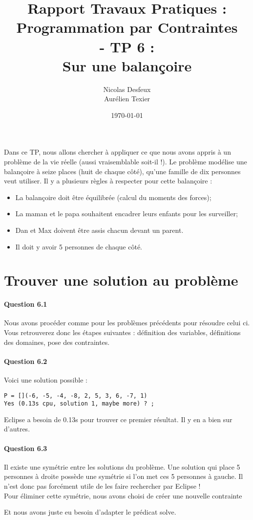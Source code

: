 \documentclass[11pt]{article} %
\date{\today}
\title{Rapport Travaux Pratiques : \\Programmation par Contraintes\\ - TP 6 : \\\textbf{Sur une balançoire}}
\author{Nicolas Desfeux\\Aurélien Texier}
\begin{document}
\lstset{language=Prolog,breaklines=true,numbers=left,basicstyle=\footnotesize ,numberstyle=\footnotesize}
\maketitle
\paragraph{} Dans ce TP, nous allons chercher à appliquer ce que nous avons appris à un problème de la vie réelle (aussi vraisemblable soit-il !). Le problème modélise une balançoire à seize places (huit de chaque côté), qu'une famille de dix personnes veut utiliser. Il y a plusieurs règles à respecter pour cette balançoire : 
\begin{itemize}
\item La balançoire doit être équilibrée (calcul du moments des forces);
\item La maman et le papa souhaitent encadrer leurs enfants pour les surveiller;
\item Dan et Max doivent être assis chacun devant un parent.
\item Il doit y avoir 5 personnes de chaque côté.
\end{itemize}
\tableofcontents
\newpage
\section{Trouver une solution au problème}
\paragraph{Question 6.1} Nous avons procéder comme pour les problèmes précédents pour résoudre celui ci. Vous retrouverez donc les étapes suivantes : définition des variables, définitions des domaines, pose des contraintes.

\paragraph{Question 6.2} Voici une solution possible : \\
\begin{lstlisting}
P = [](-6, -5, -4, -8, 2, 5, 3, 6, -7, 1)
Yes (0.13s cpu, solution 1, maybe more) ? ;
\end{lstlisting}
Eclipse a besoin de 0.13s pour trouver ce premier résultat. Il y en a bien sur d'autres.
\paragraph{Question 6.3} Il existe une symétrie entre les solutions du problème. Une solution qui place 5 personnes à droite possède une symétrie si l'on met ces 5 personnes à gauche. Il n'est donc pas forcément utile de les faire rechercher par Eclipse !\\
Pour éliminer cette symétrie, nous avons choisi de créer une nouvelle contrainte

Et nous avons juste eu besoin d'adapter le prédicat solve.

\end{document}
